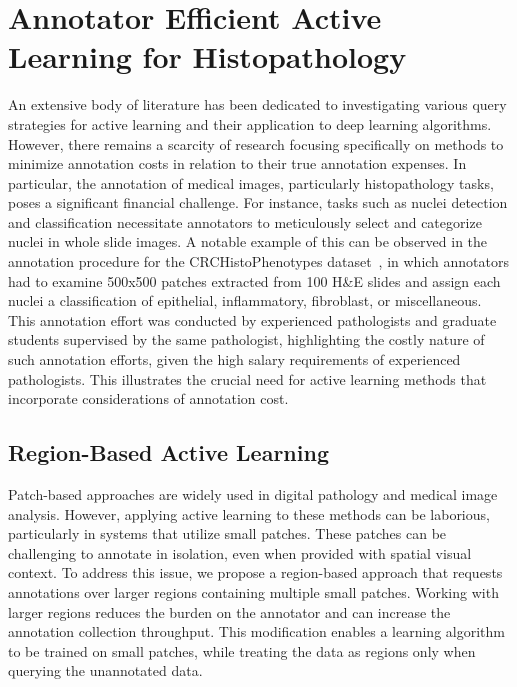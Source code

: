 \section{Annotator Efficient Active Learning for Histopathology}
\label{sec:active_annotator_efficient}
An extensive body of literature has been dedicated to investigating various query strategies for active learning and their application to deep learning algorithms. However, there remains a scarcity of research focusing specifically on methods to minimize annotation costs in relation to their true annotation expenses. In particular, the annotation of medical images, particularly histopathology tasks, poses a significant financial challenge. For instance, tasks such as nuclei detection and classification necessitate annotators to meticulously select and categorize nuclei in whole slide images. A notable example of this can be observed in the annotation procedure for the CRCHistoPhenotypes dataset~\citep{sirinukunwattana2016locality}, in which annotators had to examine 500x500 patches extracted from 100 H\&E slides and assign each nuclei a classification of epithelial, inflammatory, fibroblast, or miscellaneous. This annotation effort was conducted by experienced pathologists and graduate students supervised by the same pathologist, highlighting the costly nature of such annotation efforts, given the high salary requirements of experienced pathologists. This illustrates the crucial need for active learning methods that incorporate considerations of annotation cost.

\subsection{Region-Based Active Learning}
\label{subsec:active_region_based}
Patch-based approaches are widely used in digital pathology and medical image analysis. However, applying active learning to these methods can be laborious, particularly in systems that utilize small patches. These patches can be challenging to annotate in isolation, even when provided with spatial visual context. To address this issue, we propose a region-based approach that requests annotations over larger regions containing multiple small patches. Working with larger regions reduces the burden on the annotator and can increase the annotation collection throughput. This modification enables a learning algorithm to be trained on small patches, while treating the data as regions only when querying the unannotated data.

